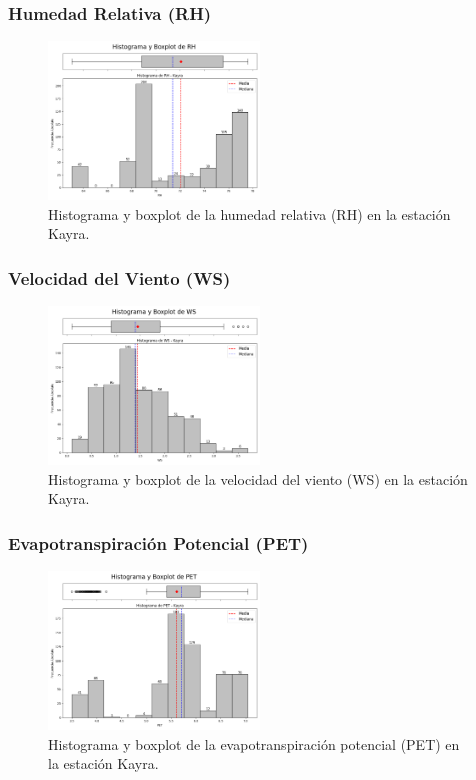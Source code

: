 \subsubsection*{Humedad Relativa (RH)}
\begin{figure}[H]
\centering
\includegraphics[width=0.5\textwidth]{resultados/por_estacion_meteorologica/Kayra/RH_histograma.png}
\caption{Histograma y boxplot de la humedad relativa (RH) en la estación Kayra.}
\label{fig:kayra_RH}
\end{figure}

\subsubsection*{Velocidad del Viento (WS)}
\begin{figure}[H]
\centering
\includegraphics[width=0.5\textwidth]{resultados/por_estacion_meteorologica/Kayra/WS_histograma.png}
\caption{Histograma y boxplot de la velocidad del viento (WS) en la estación Kayra.}
\label{fig:kayra_WS}
\end{figure}

\subsubsection*{Evapotranspiración Potencial (PET)}
\begin{figure}[H]
\centering
\includegraphics[width=0.5\textwidth]{resultados/por_estacion_meteorologica/Kayra/PET_histograma.png}
\caption{Histograma y boxplot de la evapotranspiración potencial (PET) en la estación Kayra.}
\label{fig:kayra_PET}
\end{figure}

